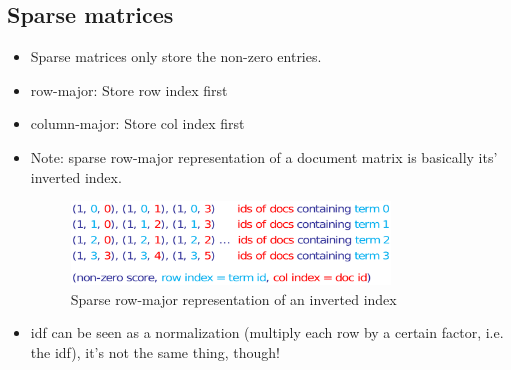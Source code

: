 \documentclass[a4paper]{scrartcl}
\newcommand{\blu}[1]{\textcolor{mainblue}{#1}}
\begin{document}
\subsection{Sparse matrices}
\label{sec:sparse_matrices}
\begin{itemize}
\item Sparse matrices only store the non-zero entries.
\item row-major: Store row index first
\item column-major: Store col index first
\item Note: sparse row-major representation of a document matrix is basically
  its' \blu{inverted index}.
  \begin{figure}[h!tbp]
    \centering
    \includegraphics[width=0.8\textwidth]{figures/sparse_ii}
    \caption{Sparse row-major representation of an inverted index}
    \label{fig:sparse_ii}
  \end{figure}
\item idf can be seen as a normalization (multiply each row by a certain factor,
  i.e. the idf), it's not the same thing, though!
\end{itemize}

\end{document}
